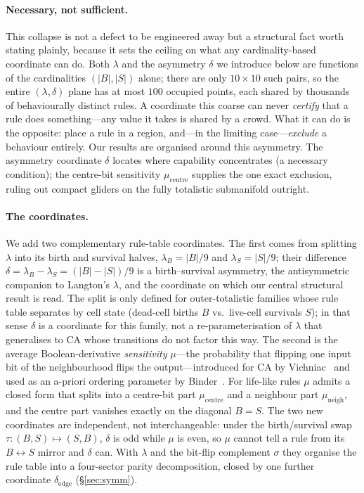 \documentclass{article}
\begin{document}
\paragraph{Necessary, not sufficient.}
This collapse is not a defect to be engineered away but a structural fact worth
stating plainly, because it sets the ceiling on what any cardinality-based
coordinate can do. Both $\lambda$ and the asymmetry $\delta$ we introduce below
are functions of the cardinalities $(|B|,|S|)$ alone; there are only $10\times10$
such pairs, so the entire $(\lambda,\delta)$ plane has at most $100$ occupied
points, each shared by thousands of behaviourally distinct rules. A coordinate
this coarse can never \emph{certify} that a rule does something---any value it
takes is shared by a crowd. What it can do is the opposite: place a rule in a
region, and---in the limiting case---\emph{exclude} a behaviour entirely. Our
results are organised around this asymmetry. The asymmetry coordinate $\delta$
locates where capability concentrates (a necessary condition); the centre-bit
sensitivity $\mu_{\text{centre}}$ supplies the one exact exclusion, ruling out
compact gliders on the fully totalistic submanifold outright.

\paragraph{The coordinates.}
We add two complementary rule-table coordinates. The first comes from splitting
$\lambda$ into its birth and survival halves, $\lambda_B=|B|/9$ and
$\lambda_S=|S|/9$; their difference $\delta=\lambda_B-\lambda_S=(|B|-|S|)/9$ is a
birth--survival asymmetry, the antisymmetric companion to Langton's $\lambda$,
and the coordinate on which our central structural result is read. The split
is only defined for outer-totalistic families whose rule table separates by
cell state (dead-cell births $B$ vs.\ live-cell survivals $S$); in that sense
$\delta$ is a coordinate for this family, not a re-parameterisation of
$\lambda$ that generalises to CA whose transitions do not factor this way.
The second is
the average Boolean-derivative \emph{sensitivity} $\mu$---the probability that
flipping one input bit of the neighbourhood flips the output---introduced for CA
by Vichniac~\cite{vichniac1990} and used as an a-priori ordering parameter by
Binder~\cite{binder1993}. For life-like rules $\mu$ admits a closed form that
splits into a centre-bit part $\mu_{\text{centre}}$ and a neighbour part
$\mu_{\text{neigh}}$, and the centre part vanishes exactly on the diagonal $B=S$.
The two new coordinates are independent, not interchangeable: under the
birth/survival swap $\tau\!:\!(B,S)\!\mapsto\!(S,B)$, $\delta$ is odd while $\mu$
is even, so $\mu$ cannot tell a rule from its $B\leftrightarrow S$ mirror and
$\delta$ can. With $\lambda$ and the bit-flip complement $\sigma$ they organise
the rule table into a four-sector parity decomposition, closed by one further
coordinate $\delta_{\text{edge}}$ (\S\ref{sec:symm}).
\end{document}
